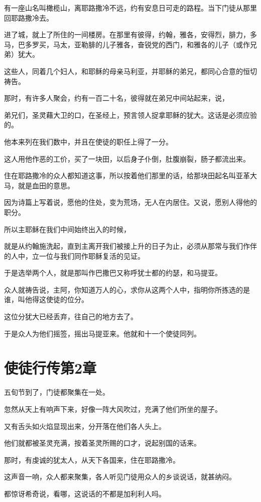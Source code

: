 \documentclass[12pt,oneside]{book}
\begin{document}
有一座山名叫橄榄山，离耶路撒冷不远，约有安息日可走的路程。当下门徒从那里回耶路撒冷去。

进了城，就上了所住的一间楼房。在那里有彼得，约翰，雅各，安得烈，腓力，多马，巴多罗买，马太，亚勒腓的儿子雅各，奋锐党的西门，和雅各的儿子（或作兄弟）犹大。

这些人，同着几个妇人，和耶稣的母亲马利亚，并耶稣的弟兄，都同心合意的恒切祷告。

那时，有许多人聚会，约有一百二十名，彼得就在弟兄中间站起来，说，

弟兄们，圣灵藉大卫的口，在圣经上，预言领人捉拿耶稣的犹大。这话是必须应验的。

他本来列在我们数中，并且在使徒的职任上得了一分。

这人用他作恶的工价，买了一块田，以后身子仆倒，肚腹崩裂，肠子都流出来。

住在耶路撒冷的众人都知道这事，所以按着他们那里的话，给那块田起名叫亚革大马，就是血田的意思。

因为诗篇上写着说，愿他的住处，变为荒场，无人在内居住。又说，愿别人得他的职分。

所以主耶稣在我们中间始终出入的时候，

就是从约翰施洗起，直到主离开我们被接上升的日子为止，必须从那常与我们作伴的人中，立一位与我们同作耶稣复活的见证。

于是选举两个人，就是那叫作巴撒巴又称呼犹士都的约瑟，和马提亚。

众人就祷告说，主阿，你知道万人的心，求你从这两个人中，指明你所拣选的是谁，叫他得这使徒的位分。

这位分犹大已经丢弃，往自己的地方去了。

于是众人为他们摇签，摇出马提亚来。他就和十一个使徒同列。

\chapter{使徒行传第2章}
五旬节到了，门徒都聚集在一处。

忽然从天上有响声下来，好像一阵大风吹过，充满了他们所坐的屋子。

又有舌头如火焰显现出来，分开落在他们各人头上。

他们就都被圣灵充满，按着圣灵所赐的口才，说起别国的话来。

那时，有虔诚的犹太人，从天下各国来，住在耶路撒冷。

这声音一响，众人都来聚集，各人听见门徒用众人的乡谈说话，就甚纳闷。

都惊讶希奇说，看哪，这说话的不都是加利利人吗。
\end{document}
